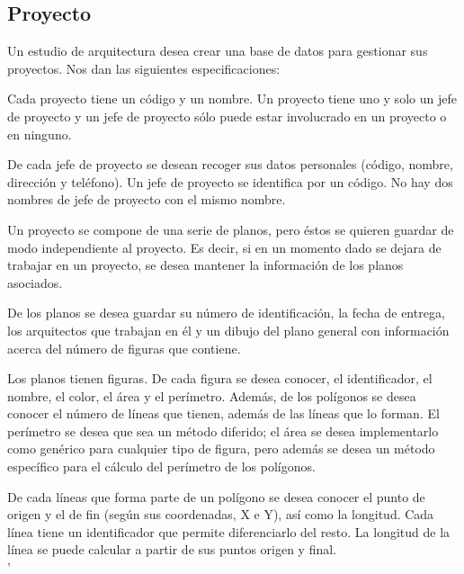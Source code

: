 \documentclass[12pt,letterpaper]{article}
\begin{document}
\subsection{\textbf{Proyecto}}
Un estudio de arquitectura desea crear una base de datos para gestionar sus proyectos. Nos dan las siguientes especificaciones: 
\par Cada proyecto tiene un código y un nombre. Un proyecto tiene uno y solo un jefe de proyecto y un jefe de proyecto sólo puede estar involucrado en un proyecto o en ninguno. 
\par De cada jefe de proyecto se desean recoger sus datos personales (código, nombre, dirección y teléfono). Un jefe de proyecto se identifica por un código. No hay dos nombres de jefe de proyecto con el mismo nombre. 
\par Un proyecto se compone de una serie de planos, pero éstos se quieren guardar de modo independiente al proyecto. Es decir, si en un momento dado se dejara de trabajar en un proyecto, se desea mantener la información de los planos asociados. 
\par De los planos se desea guardar su número de identificación, la fecha de entrega, los arquitectos que trabajan en él y un dibujo del plano general con información acerca del número de figuras que contiene. 
\par Los planos tienen figuras. De cada figura se desea conocer, el identificador, el nombre, el color, el área y el perímetro. Además, de los polígonos se desea conocer el número de líneas que tienen, además de las líneas que lo forman. El perímetro se desea que sea un método diferido; el área se desea implementarlo como genérico para cualquier tipo de figura, pero además se desea un método específico para el cálculo del perímetro de los polígonos. 
\par De cada líneas que forma parte de un polígono se desea conocer el punto de origen y el de fin (según sus coordenadas, X e Y), así como la longitud. Cada línea tiene un identificador que permite diferenciarlo del resto. La longitud de la línea se puede calcular a partir de sus puntos origen y final.\\

'
\end{document}
